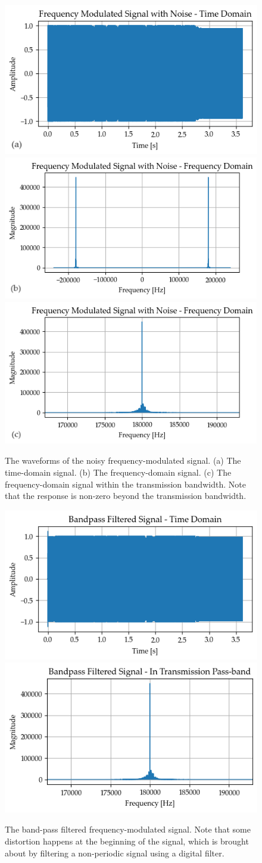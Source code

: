 \documentclass[../ECE459FinalProjectReport.tex]{subfiles}
\begin{document}
\begin{figure}[tb]
    \centering
    \includegraphics[width=0.49\linewidth]{plots/fm/noisy_fm_time.png}
    \includegraphics[width=0.49\linewidth]{plots/fm/noisy_fm_freq.png}
    \includegraphics[width=0.49\linewidth]{plots/fm/noisy_fm_freq_bw.png}
    \caption{The waveforms of the noisy frequency-modulated signal. (a) The time-domain signal. (b) The frequency-domain signal. (c) The frequency-domain signal within the transmission bandwidth. Note that the response is non-zero beyond the transmission bandwidth.}
    \label{fig:noisy-fm}
\end{figure}
\begin{figure}[tb]
    \centering
    \includegraphics[width=0.49\linewidth]{plots/fm/bpf_signal_time.png}
    \includegraphics[width=0.49\linewidth]{plots/fm/bpf_signal_freq_bw.png}
    \caption{The band-pass filtered frequency-modulated signal. Note that some distortion happens at the beginning of the signal, which is brought about by filtering a non-periodic signal using a digital filter.}
    \label{fig:fm-bpf}
\end{figure}
\end{document}
